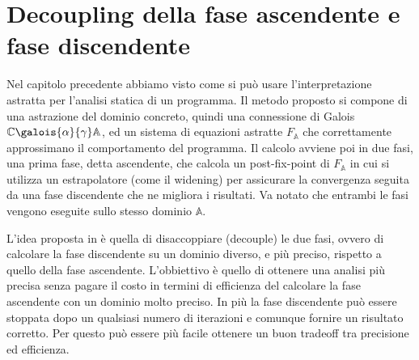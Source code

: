 \chapter{Decoupling della fase ascendente e fase discendente}\label{chapter:decoupling}

Nel capitolo precedente abbiamo visto come si può usare l'interpretazione astratta per l'analisi statica di un programma. Il metodo proposto si compone di una astrazione del dominio concreto, quindi una connessione di Galois \(\mathbb{C}\galois{\alpha}{\gamma}\mathbb{A}\),  ed un sistema di equazioni  astratte \(F_{\mathbb{A}}\) che correttamente approssimano il comportamento del programma. Il calcolo avviene poi in due fasi, una prima fase, detta ascendente, che calcola un post-fix-point di \(F_{\mathbb{A}}\) in cui si utilizza un estrapolatore (come il widening) per assicurare la convergenza seguita da una fase discendente che ne migliora i risultati. Va notato che entrambi le fasi vengono eseguite sullo stesso dominio \(\mathbb{A}\).

L'idea proposta in \cite{DBLP:conf/aplas/ArceriMZ22} è quella di disaccoppiare (decouple) le due fasi, ovvero di calcolare la fase discendente su un dominio diverso, e più preciso, rispetto a quello della fase ascendente. L'obbiettivo è quello di ottenere una analisi più precisa senza pagare il costo in termini di efficienza del calcolare la fase ascendente con un dominio molto preciso. In più la fase discendente può essere stoppata dopo un qualsiasi numero di iterazioni e comunque fornire un risultato corretto. Per questo può essere più facile ottenere un buon tradeoff tra precisione ed efficienza.

